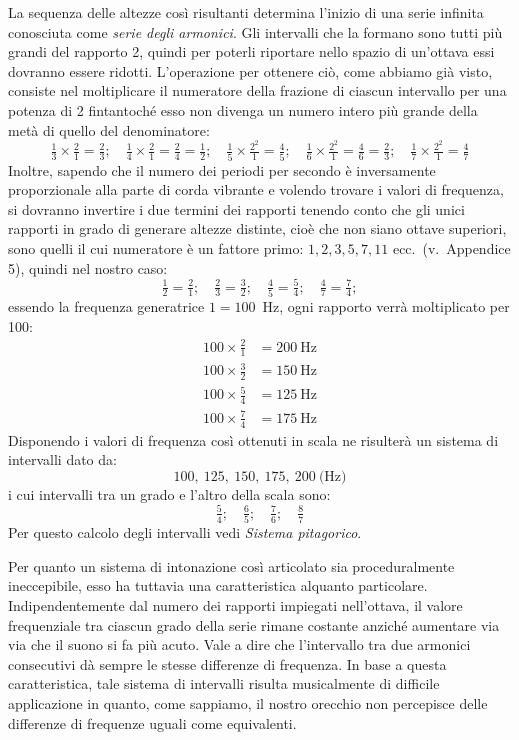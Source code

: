 La sequenza delle altezze così risultanti determina l'inizio di una serie
infinita conosciuta come \emph{serie degli armonici}. Gli intervalli che la
formano sono tutti più grandi del rapporto 2, quindi per poterli riportare nello
spazio di un'ottava essi dovranno essere ridotti. L'operazione per ottenere ciò,
come abbiamo già visto, consiste nel moltiplicare il numeratore della frazione
di ciascun intervallo per una potenza di 2 fintantoché esso non divenga un
numero intero più grande della metà di quello del denominatore:
\[
  \tfrac{1}{3}\times\tfrac{2}{1}=\tfrac{2}{3}; \quad
  \tfrac{1}{4}\times\tfrac{2}{1}=\tfrac{2}{4}=\tfrac{1}{2}; \quad
  \tfrac{1}{5}\times\tfrac{2^2}{1}=\tfrac{4}{5}; \quad
  \tfrac{1}{6}\times\tfrac{2^2}{1}=\tfrac{4}{6}=\tfrac{2}{3}; \quad
  \tfrac{1}{7}\times\tfrac{2^2}{1}=\tfrac{4}{7}
\]
Inoltre, sapendo che il numero dei periodi per secondo è inversamente
proporzionale alla parte di corda vibrante e volendo trovare i valori di
frequenza, si dovranno invertire i due termini dei rapporti tenendo conto che
gli unici rapporti in grado di generare altezze distinte, cioè che non siano
ottave superiori, sono quelli il cui numeratore è un fattore primo: $1, 2, 3, 5,
7, 11$ ecc.\ (v.\ Appendice 5), quindi nel nostro caso:
\[
  \tfrac{1}{2}=\tfrac{2}{1}; \quad \tfrac{2}{3}=\tfrac{3}{2}; \quad \tfrac{4}{5}=\tfrac{5}{4}; \quad \tfrac{4}{7}=\tfrac{7}{4};
\]
essendo la frequenza generatrice $1 = 100$~Hz, ogni rapporto verrà moltiplicato
per 100:
\begin{align*}
  100 \times \tfrac{2}{1} &= 200~\text{Hz} \\[6pt]
  100 \times \tfrac{3}{2} &= 150~\text{Hz} \\[6pt]
  100 \times \tfrac{5}{4} &= 125~\text{Hz} \\[6pt]
  100 \times \tfrac{7}{4} &= 175~\text{Hz}
\end{align*}
Disponendo i valori di frequenza così ottenuti in scala ne risulterà un sistema
di intervalli dato da:
\[
  100,\ 125,\ 150,\ 175,\ 200~\text{(Hz)}
\]
i cui intervalli tra un grado e l'altro della scala sono:
\[
  \tfrac{5}{4}; \quad \tfrac{6}{5}; \quad \tfrac{7}{6}; \quad \tfrac{8}{7}
\]
Per questo calcolo degli intervalli vedi \emph{Sistema pitagorico}.

Per quanto un sistema di intonazione così articolato sia proceduralmente
ineccepibile, esso ha tuttavia una caratteristica alquanto particolare.
Indipendentemente dal numero dei rapporti impiegati nell'ottava, il valore
frequenziale tra ciascun grado della serie rimane costante anziché aumentare via
via che il suono si fa più acuto. Vale a dire che l'intervallo tra due armonici
consecutivi dà sempre le stesse differenze di frequenza. In base a questa
caratteristica, tale sistema di intervalli risulta musicalmente di difficile
applicazione in quanto, come sappiamo, il nostro orecchio non percepisce delle
differenze di frequenze uguali come equivalenti.

